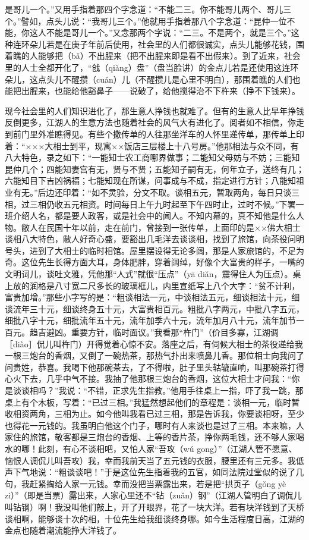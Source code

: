 \documentclass[12pt,UTF8]{ctexbook}
\begin{document}
是哥儿一个。”又用手指着那四个字念道：“不能二三。你不能哥儿两个、哥儿三个。”譬如，点头儿说：“我哥儿三个。”他就用手指着那八个字念道：“昆仲一位不能，你这人不能是哥儿一个。”又念那两个字说：“二三。不是两个，就是三个。”这种连环朵儿若是在庚子年前后使用，社会里的人们都很诚实，点头儿能够花钱，围着瞧的人能够把（bǎ）不出腥来（把不出腥来即是看不出假来）。到了近来，社会里的人士全都开化了，“戗（qiàng）盘”（盘当脸讲）的金点儿若是还使用这连环朵儿，这点头儿不醒攒（cuán）儿（不醒攒儿是心里不明白），那围着瞧的人们也能把出腥来，也能给他豁鼻子——说破了，给他搅得治不下杵来（挣不下钱来）。

现今社会里的人们知识进化了，那生意人挣钱也就难了。但有的生意人比早年挣钱反倒更多，江湖人的生意方法也随着社会的风气大有进化了。阅者如不相信，你走到前门里外准瞧得见。有些个撒传单的人往那坐洋车的人怀里递传单，那传单上印着：“×××大相士到平，现寓××饭店三层楼上十八号房。”他那相法与众不同，有八大特色，录之如下：“一能知士农工商哪界做事；二能知父母妨与不妨；三能知昆仲几个；四能知妻宫有无，贤与不贤；五能知子嗣有无，何年立子，送终有几；六能知目下吉凶祸福；七能知现在所谋，问事成与不成，指定进行方针；八能知祖业有无。”后边还印着：“如不灵验，分文不取。谈相五元，暂取两角，每日只谈三相，过三相仍收五元相资。时间每日上午九时起至下午四时止，过时不候。”下署一班介绍人名，都是要人政客，或是社会中的闻人。不知内幕的，真不知他是什么人物。敝人在民国十年以前，走在前门，曾接到一张传单，上面印的是××佛大相士谈相八大特色，敝人好奇心盛，要豁出几毛洋去谈谈相，找到了旅馆，向茶役问明号头，进到了大相士的临时相馆。屋里摆设得无论多阔，那是人家旅馆的，不足为奇。这位先生长得方面大耳，身体肥胖，穿着阔绰，好像个大富贵的样子，一嘴的文明词儿，谈吐文雅，凭他那“人式”就很“压点”（yā diǎn，震得住人为压点）。桌上放的润格是八寸宽二尺多长的玻璃框儿，内里宣纸写上八个大字：“贫不计利，富贵加增。”那些小字写的是：“粗谈相法一元，中谈相法五元，细谈相法十元，细谈流年三十元，细谈终身五十元，大富贵相百元。粗批八字两元，中批八字五元，细批八字十元，细批流年五十元，流年加季六十元，流年加月八十元，流年加节一百元。趋吉避凶。重要方针，临时面议。”我看那“杵门”（价目多寡，江湖调［diào］侃儿叫杵门）开得觉着心惊不安。落座之后，有伺候大相士的茶役递给我一根三炮台的香烟，又倒了一碗热茶，那热气扑出来喷鼻儿香。那位相士向我问了问贵姓，恭喜。我喝下他那碗茶去，了不得啦，肚子里头轱辘直响，叫那碗茶打得心火下去，几乎中气不接。我抽了他那根三炮台的香烟，这位大相士才问我：“你是谈谈相吗？”我说：“不错，正求先生指教。”他用手往桌上一指，吓了我一跳，那桌上有个木板，写着：“已过三相。”我猛然想起他们的章程是：谈相一元，临时暂收相资两角，三相为止。如今他叫我看已过三相，那是告诉我，你要谈相呀，至少也得花一元钱的。我虽明白他这个门子，哪时有人来谈也是过了三相。本来嘛，人家住的旅馆，敬客都是三炮台的香烟、上等的香片茶，挣你两毛钱，还不够人家喝水的哪！此刻，有心不谈相吧，又怕人家“吾攻（wú gong）”（江湖人管不愿意、恼恨人调侃儿叫吾攻）我，幸而我前天当了五元钱的衣服，腰里还有三元多。我低声下气地说：“粗谈谈吧！”于是这位先生指着我的五官，如同法院过堂似的说了几句，我赶紧掏给人家一元钱。幸而没把当票露出来，若是把“拱页子（gǒng yè zi）”（即是当票）露出来，人家心里还不“钻（zuǎn）钢”（江湖人管明白了调侃儿叫钻钢）啊！我没叫他们敲上，开了开眼界，花了一块大洋。若有块洋钱到了天桥谈相啊，能够谈十次的相，十位先生给我细谈终身哪。如今生活程度日高，江湖的金点也随着潮流能挣大洋钱了。
\end{document}
